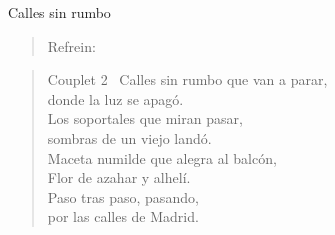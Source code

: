 \begin{song}{Calles sin rumbo}
\begin{verse}{Refrein:}
		\end{verse}
		\begin{verse}{Couplet 2}
			\ Calles sin rumbo que van a parar,\\
			donde la luz se apagó.\\
			Los soportales que miran pasar,\\
			sombras de un viejo landó.\\	
			Maceta numilde que alegra al balcón,\\
			Flor de azahar y alhelí.\\
			Paso tras paso, pasando,\\
			por las calles de Madrid.\\
		\end{verse}
	\end{song}


